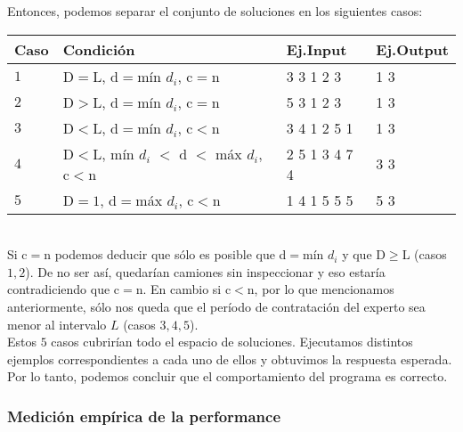 \documentclass[11pt, a4paper, twoside]{article}
\begin{document}
Entonces, podemos separar el conjunto de soluciones en los siguientes casos: \\

\begin{tabular}{|l|l|l|l|}
	\hline
	Caso &  Condición  						              & Ej.Input      & Ej.Output \\
	\hline
	$1$  &  D$=$L, d$=$mín $d_i$, c$=$n    				  & 3 3 1 2 3     & 1 3 \\	
	$2$  &	D$>$L, d$=$mín $d_i$, c$=$n     		      & 5 3 1 2 3     & 1 3 \\
	\hline	
	$3$  &	D$<$L, d$=$mín $d_i$, c$<$n     			  & 3 4 1 2 5 1   & 1 3 \\
	$4$  &	D$<$L, mín $d_i$ $<$ d $<$ máx $d_i$, c$<$n   & 2 5 1 3 4 7 4 & 3 3 \\
	$5$  &	D$=1$, d$=$máx $d_i$, c$<$n     			  & 1 4 1 5 5 5   & 5 3 \\	
	\hline
\end{tabular} \\

Si c$=$n podemos deducir que sólo es posible que d$=$mín $d_i$ y que D$\ge$L (casos $1,2$). De no ser así, quedarían camiones sin inspeccionar y eso estaría contradiciendo que c$=$n. En cambio si c$<$n, por lo que mencionamos anteriormente, sólo nos queda que el período de contratación del experto sea menor al intervalo $L$ (casos $3,4,5$). \\
Estos $5$ casos cubrirían todo el espacio de soluciones. Ejecutamos distintos ejemplos correspondientes a cada uno de ellos y obtuvimos la respuesta esperada. Por lo tanto, podemos concluir que el comportamiento del programa es correcto. 

\subsubsection{Medición empírica de la performance}

\end{document}
